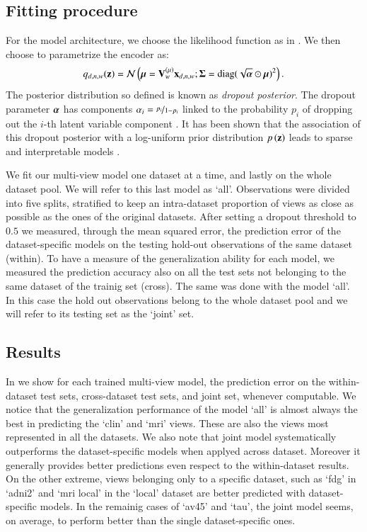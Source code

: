 \subsection{Fitting procedure}
For the model architecture, we choose the likelihood function as in .
We then choose to parametrize the encoder as:
\begin{equation}
\label{eq:dropout_posterior}
    q_{d,n,w}(\mathbf{z}) = \mathcal{N}\left(\boldsymbol{\mu} = \mathbf{V}_w^{(\mu)} \mathbf{x}_{d,n,w};\boldsymbol{\Sigma} = \text{diag}(\sqrt{\boldsymbol{\alpha}} \odot \boldsymbol{\mu})^2\right).
\end{equation}
The posterior distribution so defined is known as \textit{dropout posterior}.
The dropout parameter $\boldsymbol{\alpha}$ has components $\alpha_i = \nicefrac{p_i}{1-p_i}$ linked to the probability $p_i$ of dropping out the $i$-th latent variable component \cite{Wang2013}.
It has been shown that the association of this dropout posterior with a log-uniform prior distribution $p\left(\mathbf{z}\right)$ leads to sparse and interpretable models \cite{Antelmi2019,Molchanov2017}.

We fit our multi-view model one dataset at a time, and lastly on the whole dataset pool.
We will refer to this last model as `all'.
Observations were divided into five splits, stratified to keep an intra-dataset proportion of views as close as possible as the ones of the original datasets.
After setting a dropout threshold to $0.5$ we measured, through the mean squared error, the prediction error of the dataset-specific models on the testing hold-out observations of the same dataset (within).
To have a measure of the generalization ability for each model, we measured the prediction accuracy also on all the test sets not belonging to the same dataset of the trainig set (cross).
The same was done with the model `all'.
In this case the hold out observations belong to the whole dataset pool and we will refer to its testing set as the `joint' set.

\subsection{Results}
In  we show for each trained multi-view model, the prediction error on the within-dataset test sets, cross-dataset test sets, and joint set, whenever computable.
We notice that the generalization performance of the model `all' is almost always the best in predicting the `clin' and `mri' views.
These are also the views most represented in all the datasets.
We also note that joint model systematically outperforms the dataset-specific models when applyed across dataset.
Moreover it generally provides better predictions even respect to the within-dataset results.
On the other extreme, views belonging only to a specific dataset, such as `fdg' in `adni2' and `mri local' in the `local' dataset are better predicted with dataset-specific models.
In the remainig cases of `av45' and `tau', the joint model seems, on average, to perform better than the single dataset-specific ones.

